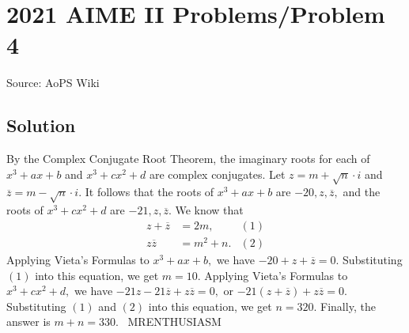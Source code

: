 \documentclass[12pt]{article}
\begin{document}
\section*{{2021 AIME II Problems/Problem 4}}
Source: AoPS Wiki

\subsection*{Solution}
By the Complex Conjugate Root Theorem, the imaginary roots for each of $x^3+ax+b$ and $x^3+cx^2+d$ are complex conjugates. Let $z=m+\sqrt{n}\cdot i$ and $\overline{z}=m-\sqrt{n}\cdot i.$ It follows that the roots of $x^3+ax+b$ are $-20,z,\overline{z},$ and the roots of $x^3+cx^2+d$ are $-21,z,\overline{z}.$ We know that \begin{align*} z+\overline{z}&=2m, & (1) \\ z\overline{z}&=m^2+n. & (2) \end{align*} Applying Vieta's Formulas to $x^3+ax+b,$ we have $-20+z+\overline{z}=0.$ Substituting $(1)$ into this equation, we get $m=10.$ Applying Vieta's Formulas to $x^3+cx^2+d,$ we have $-21z-21\overline{z}+z\overline{z}=0,$ or $-21(z+\overline{z})+z\overline{z}=0.$ Substituting $(1)$ and $(2)$ into this equation, we get $n=320.$ Finally, the answer is $m+n=\boxed{330}.$ ~MRENTHUSIASM
\end{document}
